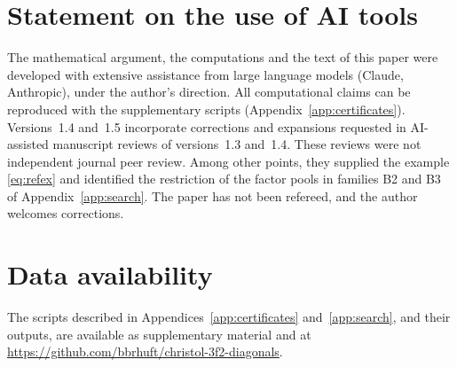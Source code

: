 \documentclass[11pt]{amsart}
\theoremstyle{definition}
\theoremstyle{remark}
\numberwithin{equation}{section}
\begin{document}
\section*{Statement on the use of AI tools}
The mathematical argument, the computations and the text of this paper were developed with extensive assistance from large language models (Claude, Anthropic), under the author's direction. All computational claims can be reproduced with the supplementary scripts (Appendix~\ref{app:certificates}). Versions~1.4 and~1.5 incorporate corrections and expansions requested in AI-assisted manuscript reviews of versions~1.3 and~1.4. These reviews were not independent journal peer review. Among other points, they supplied the example \eqref{eq:refex} and identified the restriction of the factor pools in families B2 and B3 of Appendix~\ref{app:search}. The paper has not been refereed, and the author welcomes corrections.

\section*{Data availability}
The scripts described in Appendices~\ref{app:certificates} and~\ref{app:search}, and their outputs, are available as supplementary material and at \url{https://github.com/bbrhuft/christol-3f2-diagonals}.



\end{document}
